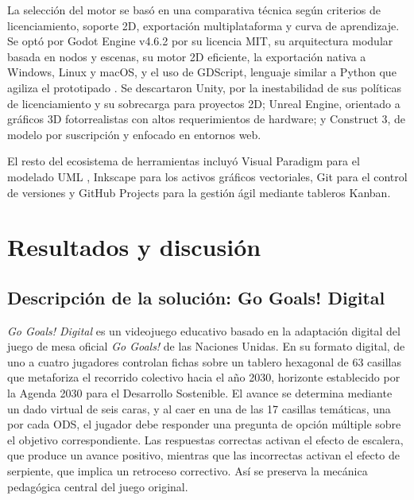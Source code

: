 \documentclass[12pt,a4paper]{article}
\begin{document}
La selección del motor se basó en una comparativa técnica según criterios de licenciamiento, soporte 2D, exportación multiplataforma y curva de aprendizaje. Se optó por Godot Engine v4.6.2 \citep{GodotEngine2026} por su licencia MIT, su arquitectura modular basada en nodos y escenas, su motor 2D eficiente, la exportación nativa a Windows, Linux y macOS, y el uso de GDScript, lenguaje similar a Python que agiliza el prototipado \citep{Vanhove2024, GodotDocs2026}. Se descartaron Unity, por la inestabilidad de sus políticas de licenciamiento y su sobrecarga para proyectos 2D; Unreal Engine, orientado a gráficos 3D fotorrealistas con altos requerimientos de hardware; y Construct 3, de modelo por suscripción y enfocado en entornos web.

El resto del ecosistema de herramientas incluyó Visual Paradigm para el modelado UML \citep{Pressman2019}, Inkscape para los activos gráficos vectoriales, Git para el control de versiones \citep{Sommerville2021} y GitHub Projects para la gestión ágil mediante tableros Kanban.

\section{Resultados y discusión}

\subsection{Descripción de la solución: Go Goals! Digital}

\textit{Go Goals! Digital} es un videojuego educativo basado en la adaptación digital del juego de mesa oficial \textit{Go Goals!} de las Naciones Unidas. En su formato digital, de uno a cuatro jugadores controlan fichas sobre un tablero hexagonal de 63 casillas que metaforiza el recorrido colectivo hacia el año 2030, horizonte establecido por la Agenda 2030 para el Desarrollo Sostenible. El avance se determina mediante un dado virtual de seis caras, y al caer en una de las 17 casillas temáticas, una por cada ODS, el jugador debe responder una pregunta de opción múltiple sobre el objetivo correspondiente. Las respuestas correctas activan el efecto de escalera, que produce un avance positivo, mientras que las incorrectas activan el efecto de serpiente, que implica un retroceso correctivo. Así se preserva la mecánica pedagógica central del juego original.
\end{document}
